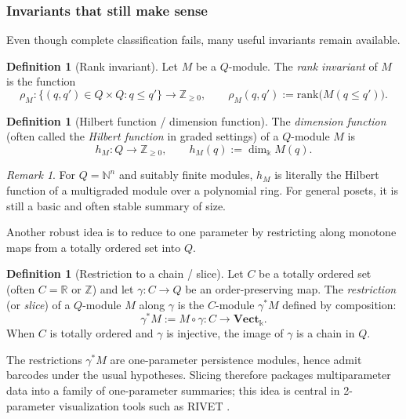 \documentclass{article}
\newcommand{\kk}{\Bbbk}
\newcommand{\<}{\langle}
\renewcommand{\>}{\rangle}
\newcommand{\bbb}[1]{\ensuremath{\mathbb{#1}}}
\theoremstyle{definition}
\newtheorem{defn}[theorem]{Definition}
\theoremstyle{remark}
\newtheorem*{remark}{Remark}
\begin{document}
	\subsubsection*{Invariants that still make sense}
	
	Even though complete classification fails, many useful invariants remain available.
	
	\begin{defn}[Rank invariant]\label{def:rank-invariant}
		Let $M$ be a $Q$-module.  The \emph{rank invariant} of $M$ is the function
		\[
		\rho_M \colon \{(q,q')\in Q\times Q : q\leq q'\}\longrightarrow \bbb{Z}_{\geq 0},
		\qquad
		\rho_M(q,q') := \mathrm{rank}\big(M(q\leq q')\big).
		\]
	\end{defn}
	
	\begin{defn}[Hilbert function / dimension function]\label{def:hilbert-function}
		The \emph{dimension function} (often called the \emph{Hilbert function} in graded
		settings) of a $Q$-module $M$ is
		\[
		h_M \colon Q\to \bbb{Z}_{\geq 0},\qquad h_M(q):=\dim_{\kk} M(q).
		\]
	\end{defn}
	
	\begin{remark}
		For $Q=\bbb{N}^n$ and suitably finite modules, $h_M$ is literally the Hilbert function
		of a multigraded module over a polynomial ring.  For general posets, it is still a
		basic and often stable summary of size.
	\end{remark}
	
	Another robust idea is to reduce to one parameter by restricting along monotone
	maps from a totally ordered set into $Q$.
	
	\begin{defn}[Restriction to a chain / slice]\label{def:slice}
		Let $C$ be a totally ordered set (often $C=\bbb{R}$ or $\bbb{Z}$) and let
		$\gamma\colon C\to Q$ be an order-preserving map.  The \emph{restriction} (or
		\emph{slice}) of a $Q$-module $M$ along $\gamma$ is the $C$-module $\gamma^*M$
		defined by composition:
		\[
		\gamma^*M := M\circ \gamma \colon C\to \mathbf{Vect}_{\kk}.
		\]
		When $C$ is totally ordered and $\gamma$ is injective, the image of $\gamma$ is a
		chain in $Q$.
	\end{defn}
	
	The restrictions $\gamma^*M$ are one-parameter persistence modules, hence admit
	barcodes under the usual hypotheses.  Slicing therefore packages multiparameter data
	into a family of one-parameter summaries; this idea is central in 2-parameter
	visualization tools such as RIVET \cite{RIVET}.
	
\end{document}
